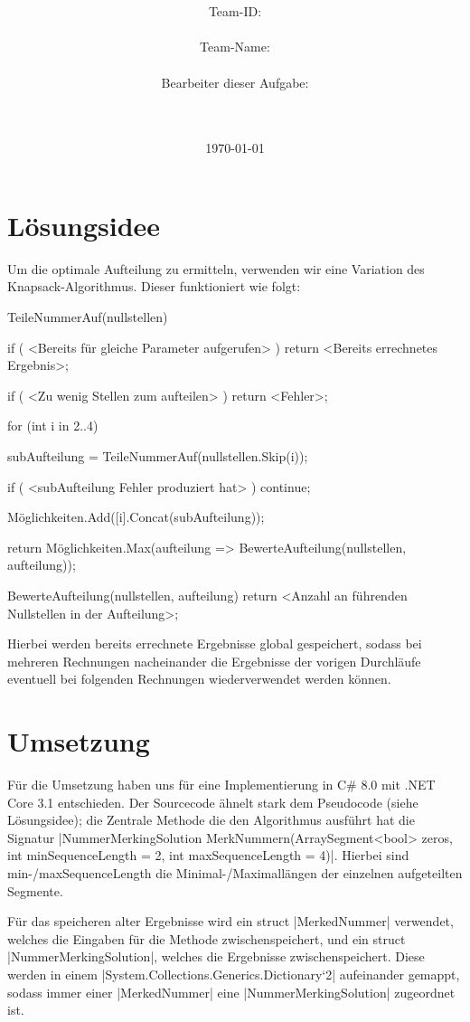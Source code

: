 \documentclass[a4paper,10pt,ngerman]{scrartcl}
\title{\textbf{\Huge\Aufgabe}}
\author{\LARGE Team-ID: \LARGE \TeamID \\\\
	    \LARGE Team-Name: \LARGE \TeamName \\\\
	    \LARGE Bearbeiter dieser Aufgabe: \\ 
	    \LARGE \Namen\\\\}
\date{\LARGE\today}
\begin{document}
\maketitle

\section{Lösungsidee}

Um die optimale Aufteilung zu ermitteln,
verwenden wir eine Variation des Knapsack-Algorithmus.
Dieser funktioniert wie folgt:

\begin{lstcs}
TeileNummerAuf(nullstellen) {
    if ( <Bereits für gleiche Parameter aufgerufen> ) {
        return <Bereits errechnetes Ergebnis>;
    }
    
    if ( <Zu wenig Stellen zum aufteilen> ) {
    	return <Fehler>;
    }

    for (int i in 2..4) {
        subAufteilung = TeileNummerAuf(nullstellen.Skip(i));

		if ( <subAufteilung Fehler produziert hat> ) continue;
		
        Möglichkeiten.Add([i].Concat(subAufteilung));
    }

    return Möglichkeiten.Max(aufteilung => BewerteAufteilung(nullstellen, aufteilung));
}

BewerteAufteilung(nullstellen, aufteilung) {
    return <Anzahl an führenden Nullstellen in der Aufteilung>;
}
\end{lstcs}

Hierbei werden bereits errechnete Ergebnisse global gespeichert, sodass bei mehreren Rechnungen nacheinander die Ergebnisse der vorigen Durchläufe eventuell bei folgenden Rechnungen wiederverwendet werden können.

\section{Umsetzung}

Für die Umsetzung haben uns für eine Implementierung in C\# 8.0 mit
.NET Core 3.1 entschieden.
Der Sourcecode ähnelt stark dem Pseudocode (siehe Lösungsidee);
die Zentrale Methode die den Algorithmus ausführt hat die Signatur
|NummerMerkingSolution MerkNummern(ArraySegment<bool> zeros, int minSequenceLength = 2, int maxSequenceLength = 4)|.
Hierbei sind min-/maxSequenceLength die Minimal-/Maximallängen
der einzelnen aufgeteilten Segmente.

Für das speicheren alter Ergebnisse wird ein struct |MerkedNummer|
verwendet, welches die Eingaben für die Methode zwischenspeichert,
und ein struct |NummerMerkingSolution|, welches die Ergebnisse
zwischenspeichert. Diese werden in einem
|System.Collections.Generics.Dictionary`2| aufeinander gemappt,
sodass immer einer |MerkedNummer| eine |NummerMerkingSolution|
zugeordnet ist.
\end{document}
